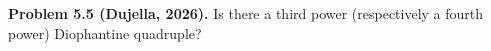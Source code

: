 \textbf{Problem 5.5 (Dujella, 2026).} Is there a third power (respectively a fourth power) Diophantine quadruple?
